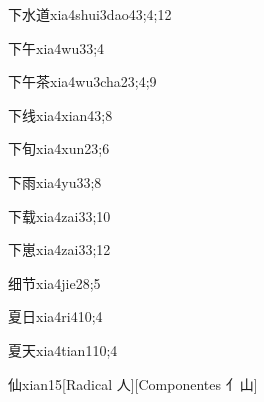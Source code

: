 \begin{verbete}{下水道}{xia4shui3dao4}{3;4;12}
\end{verbete}

\begin{verbete}{下午}{xia4wu3}{3;4}
\end{verbete}

\begin{verbete}{下午茶}{xia4wu3cha2}{3;4;9}
\end{verbete}

\begin{verbete}{下线}{xia4xian4}{3;8}
\end{verbete}

\begin{verbete}{下旬}{xia4xun2}{3;6}
\end{verbete}

\begin{verbete}{下雨}{xia4yu3}{3;8}
\end{verbete}

\begin{verbete}{下载}{xia4zai3}{3;10}
\end{verbete}

\begin{verbete}{下崽}{xia4zai3}{3;12}
\end{verbete}

\begin{verbete}{细节}{xia4jie2}{8;5}
\end{verbete}

\begin{verbete}{夏日}{xia4ri4}{10;4}
\end{verbete}

\begin{verbete}{夏天}{xia4tian1}{10;4}
\end{verbete}

\begin{verbete}{仙}{xian1}{5}[Radical 人][Componentes 亻山]
\end{verbete}


